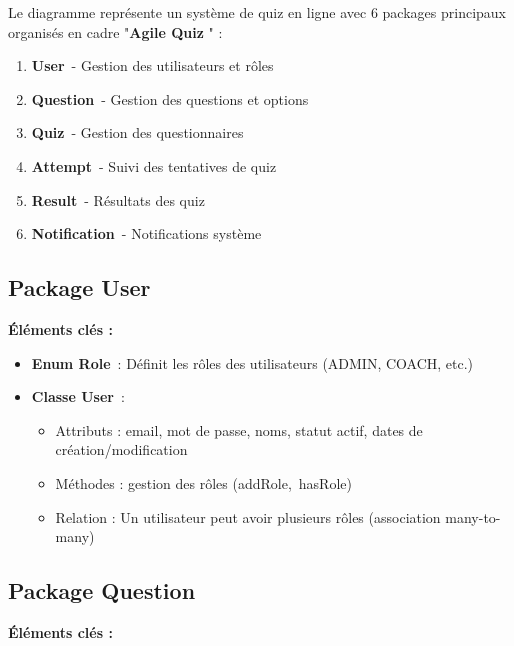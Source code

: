 \documentclass[12pt,a4paper,twoside]{report}
\begin{document}
Le diagramme représente un système de quiz en ligne avec 6 packages
principaux organisés en cadre "\textbf{Agile Quiz} " :

\begin{enumerate}
\def\labelenumi{\arabic{enumi}.}
\item
  \textbf{User}~- Gestion des utilisateurs et rôles
\item
  \textbf{Question}~- Gestion des questions et options
\item
  \textbf{Quiz}~- Gestion des questionnaires
\item
  \textbf{Attempt}~- Suivi des tentatives de quiz
\item
  \textbf{Result}~- Résultats des quiz
\item
  \textbf{Notification}~- Notifications système
\end{enumerate}

\hypertarget{package-user}{%
\subsection{Package User}\label{package-user}}

\textbf{Éléments clés :}

\begin{itemize}
\item
  \textbf{Enum Role}~: Définit les rôles des utilisateurs (ADMIN, COACH,
  etc.)
\item
  \textbf{Classe User}~:

  \begin{itemize}
  \item
    Attributs : email, mot de passe, noms, statut actif, dates de
    création/modification
  \item
    Méthodes : gestion des rôles (addRole,~hasRole)
  \item
    Relation : Un utilisateur peut avoir plusieurs rôles (association
    many-to-many)
  \end{itemize}
\end{itemize}

\hypertarget{package-question}{%
\subsection{Package Question}\label{package-question}}

\textbf{Éléments clés :}
\end{document}
